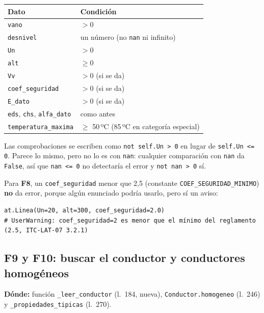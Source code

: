 \documentclass[11pt,a4paper]{article}
\newcommand{\code}[1]{\texttt{#1}}
\begin{document}
\begin{center}
\begin{tabular}{ll}
\toprule
\textbf{Dato} & \textbf{Condición} \\
\midrule
\code{vano}                  & $>0$ \\
\code{desnivel}              & un número (no \code{nan} ni infinito) \\
\code{Un}                    & $>0$ \\
\code{alt}                   & $\ge 0$ \\
\code{Vv}                    & $>0$ (si se da) \\
\code{coef\_seguridad}       & $>0$ (si se da) \\
\code{E\_dato}               & $>0$ (si se da) \\
\code{eds}, \code{chs}, \code{alfa\_dato} & como antes \\
\code{temperatura\_maxima}   & $\ge$ 50\,ºC (85\,ºC en categoría especial) \\
\bottomrule
\end{tabular}
\end{center}

Las comprobaciones se escriben como \code{not self.Un > 0} en lugar de \code{self.Un <= 0}. Parece lo mismo, pero no lo es con \code{nan}: cualquier comparación con \code{nan} da \code{False}, así que \code{nan <= 0} no detectaría el error y \code{not nan > 0} sí.

Para \textbf{F8}, un \code{coef\_seguridad} menor que 2,5 (constante \code{COEF\_SEGURIDAD\_MINIMO}) \textbf{no} da error, porque algún enunciado podría usarlo, pero sí un aviso:

\begin{lstlisting}
at.Linea(Un=20, alt=300, coef_seguridad=2.0)
# UserWarning: coef_seguridad=2 es menor que el mínimo del reglamento (2.5, ITC-LAT-07 3.2.1)
\end{lstlisting}

\subsection{F9 y F10: buscar el conductor y conductores homogéneos}

\noindent\textbf{Dónde:} función \code{\_leer\_conductor} (l.~184, nueva), \code{Conductor.homogeneo} (l.~246) y \code{\_propiedades\_tipicas} (l.~270).\par\medskip
\end{document}

